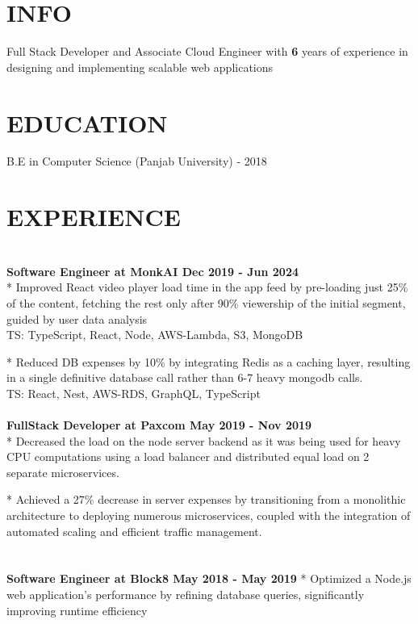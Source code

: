 \documentclass[line, margin, 12pt]{res}
\newcommand\aspace[1][5cm]{\hspace*{#1}} %
\begin{document}
\name{\aspace \huge\bf{\href{https://darshan.sh}{Darshan Sharma}}}
\address{\hspace{10mm}
~\textbullet~\href{mailto:thedarshansharma@gmail.com}{thedarshansharma@gmail.com} 
~\textbullet~+91-700-974-6321 
~\textbullet~{\href{https://darshan.sh}{darshan.sh}}~\aspace}

\begin{resume}

\section{INFO}
Full Stack Developer and Associate Cloud Engineer with \textbf{6} years of experience in designing and implementing scalable web applications

\section{EDUCATION}
B.E in Computer Science (Panjab University) - 2018

\section{EXPERIENCE}

\\ \textbf {Software Engineer at MonkAI \hspace{23mm} Dec 2019 - Jun 2024} \\
* Improved React video player load time in the app feed by pre-loading just 25\% of the content, fetching the rest only after 90\% viewership of the initial segment, guided by user data analysis \\
TS: TypeScript, React, Node, AWS-Lambda, S3, MongoDB

* Reduced DB expenses by 10\% by integrating Redis as a caching layer, resulting in a single definitive database call rather than 6-7 heavy mongodb calls. \\
TS: React, Nest, AWS-RDS, GraphQL, TypeScript \\
\\
\textbf{FullStack Developer at Paxcom \hspace{23mm} May 2019 - Nov 2019} \\
* Decreased the load on the node server backend as it was being used for heavy CPU computations using a load balancer and distributed equal load on 2 separate microservices.

* Achieved a 27\% decrease in server expenses by transitioning from a monolithic architecture to deploying numerous microservices, coupled with the integration of automated scaling and efficient traffic management.\\
\\
\\ \textbf{Software Engineer at Block8 \hspace{27mm} May 2018 - May 2019}
* Optimized a Node.js web application's performance by refining database queries, significantly improving runtime efficiency



\end{resume}
\end{document}
